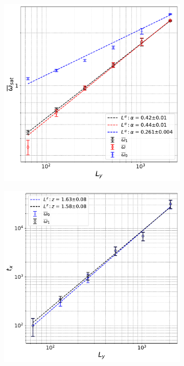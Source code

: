 \begin{figure}[!b]
    \hspace*{-1.5cm}
    \begin{subfigure}{.57\textwidth}
      \centering
      \includegraphics[width=1\textwidth]{omegavsL.pdf}
      \caption{}
    \end{subfigure}
    \begin{subfigure}{.57\textwidth}
      \centering
      \includegraphics[width=1\textwidth]{txvsL.pdf}

\end{subfigure}
\end{figure}
